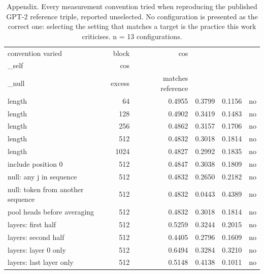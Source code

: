 \begin{table}[t]
  \centering
  \caption{Appendix. Every measurement convention tried when reproducing the published GPT-2 reference triple, reported unselected. No configuration is presented as the correct one: selecting the setting that matches a target is the practice this work criticises. n = 13 configurations.}
  \label{tab:t6}
  \begin{tabular}{lrrrrr}
    \toprule
    convention varied & block & cos\\_self & cos\\_null & excess & matches reference \\
    \midrule
    length & 64 & 0.4955 & 0.3799 & 0.1156 & no \\
    length & 128 & 0.4902 & 0.3419 & 0.1483 & no \\
    length & 256 & 0.4862 & 0.3157 & 0.1706 & no \\
    length & 512 & 0.4832 & 0.3018 & 0.1814 & no \\
    length & 1024 & 0.4827 & 0.2992 & 0.1835 & no \\
    include position 0 & 512 & 0.4847 & 0.3038 & 0.1809 & no \\
    null: any j in sequence & 512 & 0.4832 & 0.2650 & 0.2182 & no \\
    null: token from another sequence & 512 & 0.4832 & 0.0443 & 0.4389 & no \\
    pool heads before averaging & 512 & 0.4832 & 0.3018 & 0.1814 & no \\
    layers: first half & 512 & 0.5259 & 0.3244 & 0.2015 & no \\
    layers: second half & 512 & 0.4405 & 0.2796 & 0.1609 & no \\
    layers: layer 0 only & 512 & 0.6494 & 0.3284 & 0.3210 & no \\
    layers: last layer only & 512 & 0.5148 & 0.4138 & 0.1011 & no \\
    \bottomrule
  \end{tabular}
\end{table}
